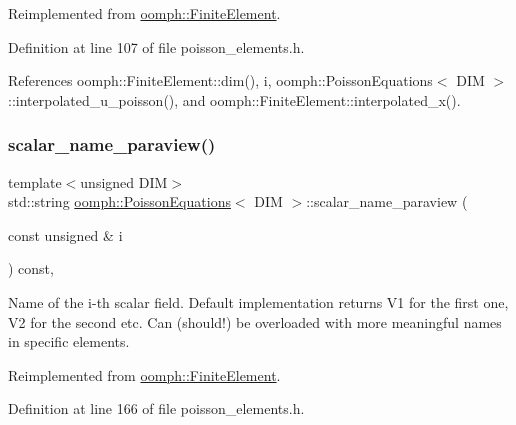 Reimplemented from \hyperlink{classoomph_1_1FiniteElement_a8bf3f75b55d4e67b644df3e22c192596}{oomph\+::\+Finite\+Element}.



Definition at line 107 of file poisson\+\_\+elements.\+h.



References oomph\+::\+Finite\+Element\+::dim(), i, oomph\+::\+Poisson\+Equations$<$ D\+I\+M $>$\+::interpolated\+\_\+u\+\_\+poisson(), and oomph\+::\+Finite\+Element\+::interpolated\+\_\+x().

\mbox{\label{classoomph_1_1PoissonEquations_ac52b68b17f7545128bfdeecf60838188}} 
\subsubsection{\texorpdfstring{scalar\+\_\+name\+\_\+paraview()}{scalar\_name\_paraview()}}
{\footnotesize\ttfamily template$<$unsigned D\+IM$>$ \\
std\+::string \hyperlink{classoomph_1_1PoissonEquations}{oomph\+::\+Poisson\+Equations}$<$ D\+IM $>$\+::scalar\+\_\+name\+\_\+paraview (\begin{DoxyParamCaption}\item[{const unsigned \&}]{i }\end{DoxyParamCaption}) const\hspace{0.3cm}{\ttfamily [inline]}, {\ttfamily [virtual]}}



Name of the i-\/th scalar field. Default implementation returns V1 for the first one, V2 for the second etc. Can (should!) be overloaded with more meaningful names in specific elements. 



Reimplemented from \hyperlink{classoomph_1_1FiniteElement_a49cc2d4f7ed5772bbc96f06760372b51}{oomph\+::\+Finite\+Element}.



Definition at line 166 of file poisson\+\_\+elements.\+h.

\mbox{\label{classoomph_1_1PoissonEquations_afcf08b45211a5a3bcf0c80919e50c9fe}} 
